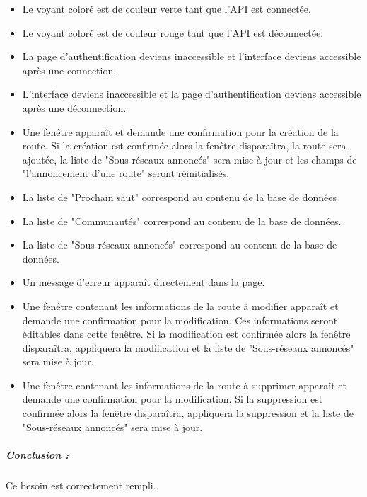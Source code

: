     \begin{itemize}
    \item Le voyant coloré est de couleur verte tant que l'API est connectée.%
    \item Le voyant coloré est de couleur rouge tant que l'API est déconnectée.%
    \item La page d'authentification deviens inaccessible et l'interface deviens accessible après une connection.%
    \item L'interface deviens inaccessible et la page d'authentification deviens accessible après une déconnection.%
    \item Une fenêtre apparaît et demande une confirmation pour la création de la route. Si la création est confirmée alors la fenêtre disparaîtra, la route sera ajoutée, la liste de "Sous-réseaux annoncés" sera mise à jour et les champs de "l'annoncement d'une route" seront réinitialisés.%
    \item La liste de "Prochain saut" correspond au contenu de la base de données%
    \item La liste de "Communautés" correspond au contenu de la base de données.%
    \item La liste de "Sous-réseaux annoncés" correspond au contenu de la base de données.%
    \item Un message d'erreur apparaît directement dans la page.%
    \item Une fenêtre contenant les informations de la route à modifier apparaît et demande une confirmation pour la modification. Ces informations seront éditables dans cette fenêtre. Si la modification est confirmée alors la fenêtre disparaîtra, appliquera la modification et la liste de "Sous-réseaux annoncés" sera mise à jour.%
    \item Une fenêtre contenant les informations de la route à supprimer apparaît et demande une confirmation pour la modification. Si la suppression est confirmée alors la fenêtre disparaîtra, appliquera la suppression et la liste de "Sous-réseaux annoncés" sera mise à jour.%
    
\end{itemize}
\subparagraph{Conclusion :}Ce besoin est correctement rempli.

